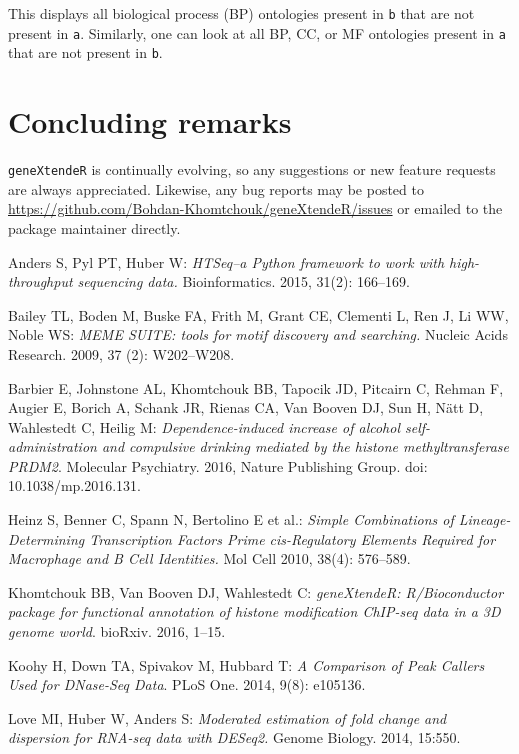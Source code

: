 \documentclass[12pt]{article}
\begin{document}
{This displays all biological process (BP) ontologies present in \texttt{b} that are not present in \texttt{a}.  Similarly, one can look at all BP, CC, or MF ontologies present in \texttt{a} that are not present in \texttt{b}. 

\section*{Concluding remarks}

\texttt{geneXtendeR} is continually evolving, so any suggestions or new feature requests are always appreciated.  Likewise, any bug reports may be posted to \url{https://github.com/Bohdan-Khomtchouk/geneXtendeR/issues} or emailed to the package maintainer directly.    


\begin{thebibliography}{31}

Anders S, Pyl PT, Huber W:  \textit{HTSeq--a Python framework to work with high-throughput sequencing data.}  Bioinformatics.  2015, 31(2): 166--169. 

Bailey TL, Boden M, Buske FA, Frith M, Grant CE, Clementi L, Ren J, Li WW, Noble WS:  \textit{MEME SUITE: tools for motif discovery and searching.}  Nucleic Acids Research.  2009, 37 (2): W202--W208. 

Barbier E, Johnstone AL, Khomtchouk BB, Tapocik JD, Pitcairn C, Rehman F, Augier E, Borich A, Schank JR, Rienas CA, Van Booven DJ, Sun H, N\"{a}tt D, Wahlestedt C, Heilig M: \textit{Dependence-induced increase of alcohol self-administration and compulsive drinking mediated by the histone methyltransferase PRDM2}.  Molecular Psychiatry. 2016, Nature Publishing Group. doi: 10.1038/mp.2016.131.

Heinz S, Benner C, Spann N, Bertolino E et al.: \textit{Simple Combinations of Lineage-Determining Transcription Factors Prime cis-Regulatory Elements Required for Macrophage and B Cell Identities.} Mol Cell 2010, 38(4): 576--589.

Khomtchouk BB, Van Booven DJ, Wahlestedt C: \textit{geneXtendeR: R/Bioconductor package for functional annotation of histone modification ChIP-seq data in a 3D genome world}.  bioRxiv. 2016, 1--15. 

Koohy H, Down TA, Spivakov M, Hubbard T: \textit{A Comparison of Peak Callers Used for DNase-Seq Data}.  PLoS One. 2014, 9(8): e105136. 

Love MI, Huber W, Anders S:  \textit{Moderated estimation of fold change and dispersion for RNA-seq data with DESeq2.}  Genome Biology.  2014, 15:550.


\end{thebibliography}}
\end{document}
